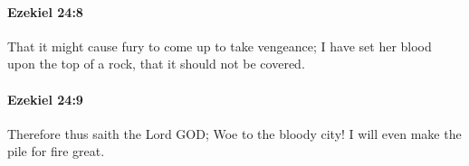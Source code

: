 		\paragraph{Ezekiel 24:8} %
			\label{EZEKIEL-24-8}

			That it might cause fury to come up to take vengeance; I have set her blood upon the top of a rock, that it should not be covered.


		\paragraph{Ezekiel 24:9} %
			\label{EZEKIEL-24-9}

			Therefore thus saith the Lord GOD; Woe to the bloody city! I will even make the pile for fire great.


